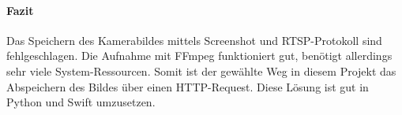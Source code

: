 \paragraph{Fazit} 
Das Speichern des Kamerabildes mittels Screenshot und RTSP-Protokoll sind fehlgeschlagen. Die Aufnahme mit FFmpeg funktioniert gut, benötigt allerdings sehr viele System-Ressourcen. Somit ist der gewählte Weg in diesem Projekt das Abspeichern des Bildes über einen HTTP-Request. Diese Lösung ist gut in Python und Swift umzusetzen. 

